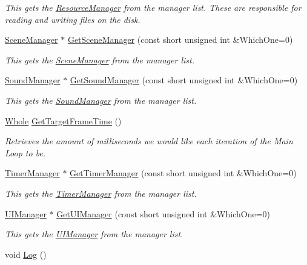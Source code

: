 \begin{DoxyCompactItemize}
\begin{DoxyCompactList}\small\item\em This gets the \hyperlink{classphys_1_1ResourceManager}{ResourceManager} from the manager list. These are responsible for reading and writing files on the disk. \item\end{DoxyCompactList}\item 
\hyperlink{classphys_1_1SceneManager}{SceneManager} $\ast$ \hyperlink{classphys_1_1World_a86a86a78851845837ccc43da8b3a3019}{GetSceneManager} (const short unsigned int \&WhichOne=0)
\begin{DoxyCompactList}\small\item\em This gets the \hyperlink{classphys_1_1SceneManager}{SceneManager} from the manager list. \item\end{DoxyCompactList}\item 
\hyperlink{classphys_1_1SoundManager}{SoundManager} $\ast$ \hyperlink{classphys_1_1World_ac662bf5d5737a99cd3bc3ff45e7d79b8}{GetSoundManager} (const short unsigned int \&WhichOne=0)
\begin{DoxyCompactList}\small\item\em This gets the \hyperlink{classphys_1_1SoundManager}{SoundManager} from the manager list. \item\end{DoxyCompactList}\item 
\hyperlink{namespacephys_a460f6bc24c8dd347b05e0366ae34f34a}{Whole} \hyperlink{classphys_1_1World_aa063ace52be484c7b03ec5859453f48b}{GetTargetFrameTime} ()
\begin{DoxyCompactList}\small\item\em Retrieves the amount of milliseconds we would like each iteration of the Main Loop to be. \item\end{DoxyCompactList}\item 
\hyperlink{classphys_1_1TimerManager}{TimerManager} $\ast$ \hyperlink{classphys_1_1World_a8e25bc6da5864d303b246224901af852}{GetTimerManager} (const short unsigned int \&WhichOne=0)
\begin{DoxyCompactList}\small\item\em This gets the \hyperlink{classphys_1_1TimerManager}{TimerManager} from the manager list. \item\end{DoxyCompactList}\item 
\hyperlink{classphys_1_1UIManager}{UIManager} $\ast$ \hyperlink{classphys_1_1World_ab7888bf9286df602490c30df6382fde9}{GetUIManager} (const short unsigned int \&WhichOne=0)
\begin{DoxyCompactList}\small\item\em This gets the \hyperlink{classphys_1_1UIManager}{UIManager} from the manager list. \item\end{DoxyCompactList}\item 
\hypertarget{classphys_1_1World_a7dbf83226aaa109a09efab00ae682761}{
void \hyperlink{classphys_1_1World_a7dbf83226aaa109a09efab00ae682761}{Log} ()}
\label{classphys_1_1World_a7dbf83226aaa109a09efab00ae682761}


\end{DoxyCompactItemize}
